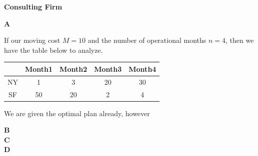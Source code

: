 \documentclass[11pt]{article}
\begin{document}
	

\medskip


\lineacross


\begin{solution} \textbf{Consulting Firm} \\

	\hfil
	
	\textbf{A}\\
	
	\hfil
	
	If our moving cost $M = 10$ and the number of operational months $n = 4$, then we have the table below to analyze.
		
		
	\begin{center}
		\begin{tabular}{ | c | c | c | c | c |}
			 \hline  
			 & Month1 & Month2 & Month3 & Month4 \\
			\hline
 			NY & 1 & 3 	& 20 & 30\\ 
 			\hline
 			SF & 50 & 20 & 2 & 4\\  
 			\hline  
		\end{tabular}
	\end{center}
	
	We are given the optimal plan already, however
	 
	\textbf{B}\\
	
	\textbf{C}\\
	
	\textbf{D}\\
\end{solution}
\end{document}
